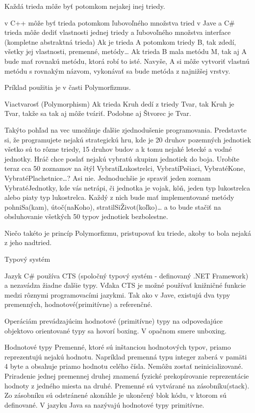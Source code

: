 Každá trieda môže byť potomkom nejakej inej triedy.

v C++ môže byť trieda potomkom ľubovoľného množstva tried
v Jave a C\# trieda môže dediť vlastnosti jednej triedy a ľubovoľného množstva interface (kompletne abstraktná trieda)
Ak je trieda A potomkom triedy B, tak zdedí, všetky jej vlastnosti, premenné, metódy… Ak trieda B mala metódu M, tak aj A bude mať rovnakú metódu, ktorá robí to isté. Navyše, A si môže vytvoriť vlastnú metódu s rovnakým názvom, vykonávať sa bude metóda z najnižšej vrstvy.

Príklad použitia je v časti Polymorfizmus.

Viactvarosť (Polymorphism)
Ak trieda Kruh dedí z triedy Tvar, tak Kruh je Tvar, takže sa tak aj môže tváriť. Podobne aj Štvorec je Tvar.

Takýto pohľad na vec umožňuje ďalšie zjednodušenie programovania. Predstavte si, že programujete nejakú strategickú hru, kde je 20 druhov pozemných jednotiek všetko sú to rôzne triedy, 15 druhov budov a k tomu nejaké letecké a vodné jednotky. Hráč chce poslať nejakú vybratú skupinu jednotiek do boja. Urobíte teraz cca 50 zoznamov na štýl VybratíLukostrelci, VybratíPešiaci, VybratéKone, VybratéPlachetnice…? Asi nie. Jednoduchšie je spraviť jeden zoznam VybratéJednotky, kde vás netrápi, či jednotka je vojak, kôň, jeden typ lukostrelca alebo piaty typ lukostrelca. Každý z nich bude mať implementované metódy pohniSa(kam), útoč(naKoho), stratilSiŽivot(koľko)… a to bude stačiť na obsluhovanie všetkých 50 typov jednotiek bezbolestne.

Niečo takéto je princíp Polymorfizmu, pristupovať ku triede, akoby to bola nejaká z jeho nadtried.





Typový systém

Jazyk C\# používa CTS (spoločný typový systém - definovaný .NET Framework) a nezavádza žiadne ďalšie typy. Vďaka CTS je možné používať knižničné funkcie medzi rôznymi programovacími jazykmi. Tak ako v Jave, existujú dva typy premenných, hodnotové(primitívne) a referenčné.

Operáciám prevádzajúcim hodnotové (primitívne) typy na odpovedajúce objektovo orientované typy sa hovorí boxing. V opačnom smere unboxing.




Hodnotové typy
Premenné, ktoré sú inštanciou hodnotových typov, priamo reprezentujú nejakú hodnotu. Napríklad premenná typu integer zaberá v pamäti 4 byte a obsahuje priamo hodnotu celého čísla. Nemôžu zostať neinicializované. Priradenie jednej premennej druhej znamená fyzické prekopírovanie reprezentácie hodnoty z jedného miesta na druhé. Premenné sú vytvárané na zásobníku(stack). Zo zásobníku sú odstránené akonáhle je ukončený blok kódu, v ktorom sú definované. V jazyku Java sa nazývajú hodnotové typy primitívne.


